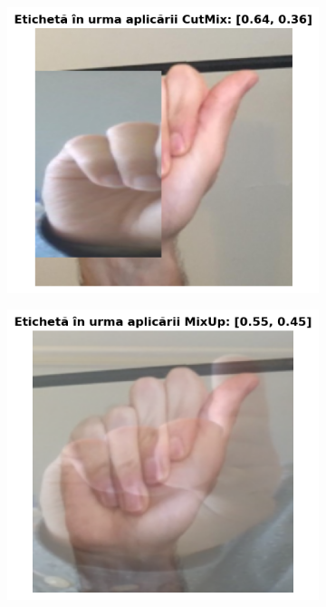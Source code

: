 \begin{figure}[H]
\begin{subfigure}{0.22\textwidth}
      \caption{}
    \end{subfigure}
    \hspace{0.001\textwidth}
    \begin{subfigure}{0.25\textwidth}
      \includegraphics[width=\linewidth]{images/2-recunoasterea-asl/ctmx_img_1.png}
      \caption{}
    \end{subfigure}
    \hspace{0.001\textwidth}
    \begin{subfigure}{0.25\textwidth}
      \includegraphics[width=\linewidth]{images/2-recunoasterea-asl/mxup_img_1.png}
      \caption{}
    \end{subfigure}


\end{figure}
